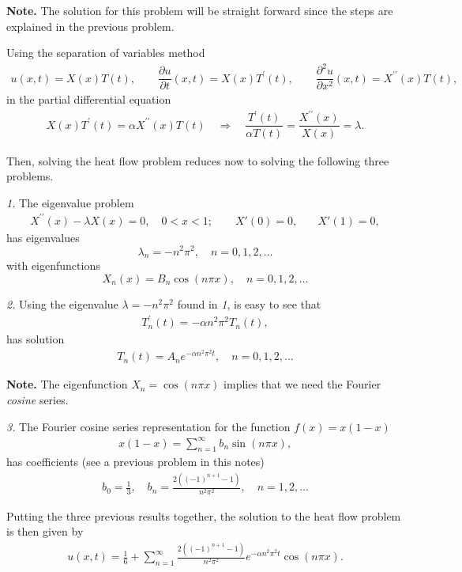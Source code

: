 \documentclass[11pt]{article}
\begin{document}
\begin{solution}
\textbf{Note.} The solution for this problem will be straight forward since the steps are explained in the previous problem.

Using the separation of variables method
\begin{eqnarray*}
u(x,t) = X(x)T(t), \qquad
\dfrac{\partial u }{\partial t }(x,t) = X(x)T^{\prime}(t), \qquad
\dfrac{\partial^2 u}{\partial x^2}(x,t) = X^{\prime \prime}(x)T(t),
\end{eqnarray*}
in the partial differential equation
\begin{eqnarray*}
X(x)T^{\prime}(t) = \alpha X^{\prime \prime}(x)T(t) \quad 
\Rightarrow \quad \dfrac{T^{\prime}(t)}{\alpha T(t)} = \dfrac{X^{\prime \prime}(x)}{X(x)} = \lambda.
\end{eqnarray*}

Then, solving the heat flow problem reduces now to solving the following three problems.

\textsl{1.} The eigenvalue problem
\begin{eqnarray*}
X^{\prime \prime}(x) - \lambda X(x) =0, \quad 0<x<1; \qquad
X'(0)=0, \quad & X'(1) =0,
\end{eqnarray*}
has eigenvalues 
$$\lambda_{n} = -n^2\pi^{2}, \quad n = 0,1,2 , \dots$$ 
with eigenfunctions 
$$\boxed{X_{n}(x) = B_{n}\cos(n\pi x)},\quad n = 0,1,2 , \dots$$


\textsl{2. } Using the eigenvalue $\lambda = -n^2\pi^{2}$ found in \textsl{1}, is easy to see that 
\begin{eqnarray*}
T_{n}^{\prime}(t) = - \alpha n^{2}\pi^{2} T_{n}(t),
\end{eqnarray*}
has solution
\begin{eqnarray*}
\boxed{T_{n}(t) = A_{n}e^{-\alpha n^{2}\pi^{2} t}},\quad n = 0,1,2 , \dots
\end{eqnarray*}

\textbf{Note.} The eigenfunction $X_{n}=\cos(n\pi x)$ implies that we need the Fourier \textsl{cosine} series.

\textsl{3. } The Fourier cosine series representation for the function $f(x)=x(1-x)$ 
\begin{eqnarray*}
x(1-x) = \sum_{n=1}^{\infty} b_{n} \sin(n\pi x),
\end{eqnarray*}
has coefficients (see a previous problem in this notes)
\begin{eqnarray*}
\boxed{b_{0} = \frac{1}{3}, \quad b_{n} = \frac{2((-1)^{n+1}-1)}{n^{2}\pi^{2}}}, \quad n = 1,2,\dots
\end{eqnarray*}

Putting the three previous results together, the solution to the heat flow problem is then given by
\begin{eqnarray*}
\boxed{u(x,t) = \frac{1}{6} + \sum_{n=1}^{\infty}\frac{2((-1)^{n+1}-1)}{n^{2}\pi^{2}}e^{-\alpha n^{2}\pi^{2}t}\cos (n\pi x)}.
\end{eqnarray*}


\end{solution}
\end{document}

